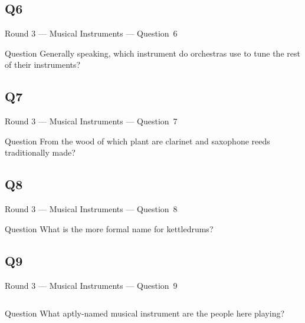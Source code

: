 \documentclass[11pt]{beamer}
\begin{document}
\subsection*{Q6}
\begin{frame}[t]{Round 3 --- Musical Instruments --- \mbox{Question 6}}
\vspace{-0.5em}
\begin{block}{Question}
Generally speaking, which instrument do orchestras use to tune the rest of their instruments?
\end{block}
\end{frame}
\subsection*{Q7}
\begin{frame}[t]{Round 3 --- Musical Instruments --- \mbox{Question 7}}
\vspace{-0.5em}
\begin{block}{Question}
From the wood of which plant are clarinet and saxophone reeds traditionally made?
\end{block}
\end{frame}
\subsection*{Q8}
\begin{frame}[t]{Round 3 --- Musical Instruments --- \mbox{Question 8}}
\vspace{-0.5em}
\begin{block}{Question}
What is the more formal name for kettledrums?
\end{block}
\end{frame}
\subsection*{Q9}
\begin{frame}[t]{Round 3 --- Musical Instruments --- \mbox{Question 9}}
\vspace{-0.5em}
\begin{columns}[T,totalwidth=\linewidth]
\begin{column}{0.32\linewidth}
\begin{block}{Question}
What aptly-named musical instrument are the people here playing?
\end{block}
\end{column}
\begin{column}{0.65\linewidth}
\begin{center}
\texttt{[image: \{Images/alphorn]}.jpg}
\end{center}
\end{column}
\end{columns}
\end{frame}
\end{document}
